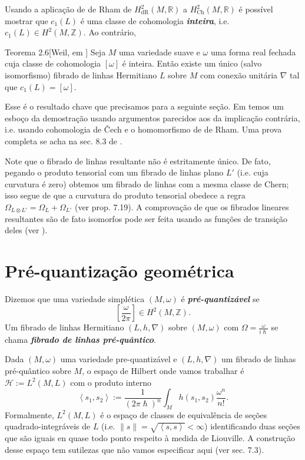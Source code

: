 Usando a aplicação de de Rham de $H_{\operatorname{dR}}^2(M,\mathbb{R})$ a $H^{2}_{\operatorname{Ch}}(M,\mathbb{R})$ é possível mostrar que $c_1(L)$ é uma classe de cohomologia \textit{\textbf{inteira}}, i.e. $c_1(L)\in H^{2}(M,\mathbb{Z})$. Ao contrário,
\begin{thing4}{Teorema 2.6}[Weil, em \cite{wang}]\leavevmode
	Seja $M$ uma variedade suave e $\omega$ uma forma real fechada cuja classe de cohomologia $[\omega]$  é inteira. Então existe um único (salvo isomorfismo) fibrado de linhas Hermitiano $L$ sobre $M$ com conexão unitária $\nabla$ tal que $c_1(L)=[\omega]$.
\end{thing4}
Esse é o resultado chave que precisamos para a seguinte seção. Em \cite{wang} temos um esboço da demostração usando argumentos parecidos aos da implicação contrária, i.e. usando cohomologia de \v{C}ech e o homomorfismo de de Rham. Uma prova completa se acha na sec. 8.3 de \cite{wood}.

Note que o fibrado de linhas resultante não é estritamente único. De fato, pegando o produto tensorial com um fibrado de linhas plano $L'$ (i.e. cuja curvatura  é zero) obtemos um fibrado de linhas com a mesma classe de Chern; isso segue de que a curvatura do produto tensorial obedece a regra $\Omega_{L \otimes L'}=\Omega_L + \Omega_{L'}$ (ver  \cite{leec} prop. 7.19).  A comprovação de que os fibrados lineares resultantes são de fato isomorfos pode ser feita usando as funções de transição deles (ver \cite{wang}).


\section{Pré-quantização geométrica}

Dizemos que uma variedade simplética $(M,\omega)$ é \textit{\textbf{pré-quantizável}} se
\[\left[ \frac{\omega}{2\pi} \right] \in H^{2}(M,\mathbb{Z}).\]
Um fibrado de linhas Hermitiano $(L,h,\nabla)$ sobre $(M,\omega)$ com $\Omega=\frac{\omega}{i\hslash}$ se chama \textit{\textbf{fibrado de linhas pré-quântico}}.

Dada $(M,\omega)$ uma variedade pre-quantizável e $(L,h,\nabla)$ um fibrado de linhas pré-quântico sobre $M$, o espaço de Hilbert onde vamos trabalhar é $\mathcal{H}:=L^2(M,L)$ com o produto interno
\[\left<s_1,s_2\right>:=\frac{1}{(2\pi \hslash)^n}\int_{M}h(s_1,s_2)\frac{\omega^n}{n!}.\]
Formalmente, $L^2(M,L)$ é o espaço de classes de equivalência de seções quadrado-integráveis de $L$ (i.e. $\|s\|=\sqrt{\left<s,s\right>}<\infty$) identificando duas seções que são iguais en quase todo ponto respeito à medida de Liouville. A construção desse espaço tem sutilezas que não vamos especificar aqui (ver \cite{hallq} sec. 7.3).

